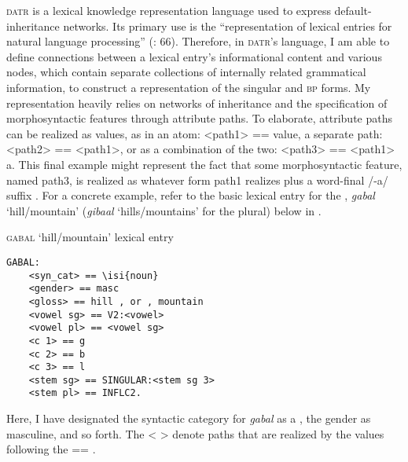 \documentclass[output=paper,modfonts]{langscibook}
\begin{document}
\textsc{datr} is a lexical knowledge representation language used to express default-inheritance networks. Its primary use is the “representation of lexical entries for natural language processing” (\citealt{Evans1989}: 66). Therefore, in \textsc{datr}’s language, I am able to define connections between a lexical entry’s informational content and various nodes, which contain separate collections of internally related grammatical information, to construct a representation of the singular and \textsc{bp} forms. My representation heavily relies on networks of inheritance and the specification of morphosyntactic features through attribute paths. To elaborate, attribute paths can be realized as values, as in an atom: <path1> == value, a separate path: <path2> == <path1>, or as a combination of the two: <path3> == <path1> a. This final example might represent the fact that some morphosyntactic feature, named path3, is realized as whatever form path1 realizes plus a word-final /-a/ suffix \citep[167--168]{Evans1996}. For a concrete example, refer to the basic lexical entry for the , \textit{gabal} ‘hill/mountain’ (\textit{gibaal} ‘hills/mountains’ for the plural) below in .


\ea \textsc{gabal} ‘hill/mountain’ lexical entry\\ \begin{lstlisting} 
GABAL:
    <syn_cat> == \isi{noun}
    <gender> == masc
    <gloss> == hill , or , mountain
    <vowel sg> == V2:<vowel>
    <vowel pl> == <vowel sg>
    <c 1> == g
    <c 2> == b
    <c 3> == l
    <stem sg> == SINGULAR:<stem sg 3>
    <stem pl> == INFLC2. 
\end{lstlisting}
\label{fig:winchester:1}
\z

Here, I have designated the syntactic category for \textit{gabal} as a , the gender as masculine, and so forth. The < > denote paths that are realized by the values following the == \citep[169]{Evans1996}.
\end{document}
